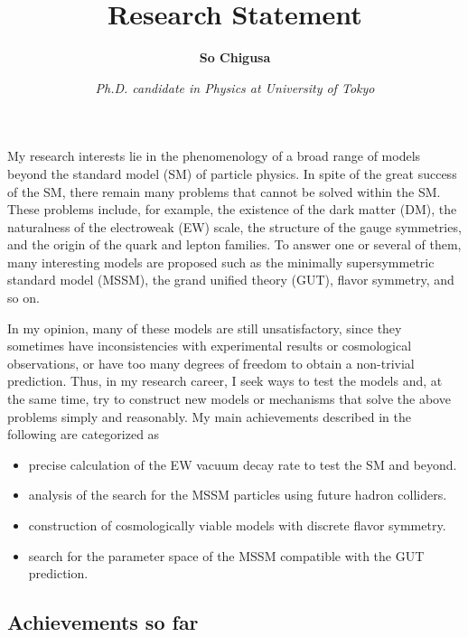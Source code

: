 \documentclass[12pt,notitlepage]{article}
\title{\vspace*{-3cm}Research Statement}
\author{\textbf{So Chigusa}}
\date{\vspace*{-4mm}\textit{Ph.D. candidate in Physics at University of Tokyo}}
\begin{document}
\maketitle

My research interests lie in the phenomenology of a broad range of models beyond the standard model (SM) of particle physics.
In spite of the great success of the SM, there remain many problems that cannot be solved within the SM.
These problems include, for example, the existence of the dark matter (DM), the naturalness of the electroweak (EW) scale, the structure of the gauge symmetries, and the origin of the quark and lepton families.
To answer one or several of them, many interesting models are proposed such as the minimally supersymmetric standard model (MSSM), the grand unified theory (GUT), flavor symmetry, and so on.

In my opinion, many of these models are still unsatisfactory, since they sometimes have inconsistencies with experimental results or cosmological observations, or have too many degrees of freedom to obtain a non-trivial prediction.
Thus, in my research career, I seek ways to test the models and, at the same time, try to construct new models or mechanisms that solve the above problems simply and reasonably.
My main achievements described in the following are categorized as
\vspace{-1.3mm}
\begin{itemize}
  \setlength{\parskip}{0mm}
  \setlength{\itemsep}{1mm}
  \item precise calculation of the EW vacuum decay rate to test the SM and beyond.
  \item analysis of the search for the MSSM particles using future hadron colliders.
  \item construction of cosmologically viable models with discrete flavor symmetry.
  \item search for the parameter space of the MSSM compatible with the GUT prediction.
\end{itemize}

\vspace*{-2mm}
\subsection*{Achievements so far}
\end{document}
